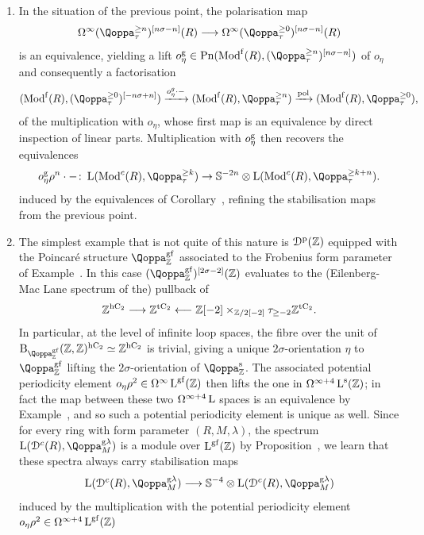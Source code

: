 \begin{examples}
\begin{enumerate}
\item In the situation of the previous point, the polarisation map
\[
\Omega^\infty(\QF^{\geq n}_\tau)\qshift{n\sigma-n}(R) \longrightarrow \Omega^\infty(\QF^{\geq 0}_\tau)\qshift{n\sigma-n}(R)
\]
is an equivalence, yielding a lift $o^\mathrm g_\eta \in \Poinc(\Modf{R},(\QF^{\geq n}_\tau)\qshift{n\sigma-n})$ of $o_\eta$ and consequently a factorisation
\[
(\Modf{R},(\QF^{\geq 0}_\tau)\qshift{-n\sigma+n}) \xrightarrow{o_\eta^g \cdot -} (\Modf{R},\QF^{\geq n}_\tau) \xrightarrow{\mathrm{pol}} (\Modf{R},\QF^{\geq 0}_\tau),
\]
of the multiplication with $o_\eta$, whose first map is an equivalence by direct inspection of linear parts. Multiplication with $o_\eta^{\mathrm{g}}$ then recovers the equivalences 
\[
o^\mathrm g_{\eta}\rho^n \cdot - \colon \L(\Mod^c(R),\QF^{\geq k}_{\tau}) \to \SS^{-2n}\otimes \L(\Mod^c(R),\QF^{\geq k+n}_{\tau}).
\]
induced by the equivalences of Corollary~, refining the stabilisation maps from the previous point.
\item 
The simplest example that is not quite of this nature 
is ${\mathcal D}^{\mathrm{p}}(\mathbb{Z})$ equipped with the Poincar\'e structure $\QF^{\g\fr}_{\ZZ}$ associated to the Frobenius
form parameter of Example~.
In this case $(\QF^{\g\fr}_{\ZZ})\qshift{2\sigma-2}(\ZZ)$ evaluates to the (Eilenberg-Mac Lane spectrum of the) pullback of
\[
\mathbb{Z}^{\mathrm{h}\mathrm{C_2}} \longrightarrow \mathbb{Z}^{\mathrm{t}\mathrm{C_2}} \longleftarrow \mathbb{Z}[-2] \times_{\mathbb{Z}/2[-2]} \tau_{\geq -2}\mathbb{Z}^{\mathrm{t}\mathrm{C_2}}.
\]
In particular, at the level of infinite loop spaces, the fibre over the unit of $\Bil_{\QF^{\g\fr}_{\ZZ}}(\ZZ, \ZZ)^{\hC} \simeq \ZZ^\hC$ is trivial, giving a unique $2\sigma$-orientation $\eta$ to $\QF^{\g\fr}_{\ZZ}$ lifting the $2\sigma$-orientation of $\QF^{\sym}_{\ZZ}$. The associated potential periodicity element $o_{\eta}\rho^2  \in \Omega^{\infty}\operatorname L^{\mathrm{g}\mathrm{f}}(\mathbb{Z})$ then lifts the one in $\Omega^{\infty+4}\operatorname L^{\mathrm{s}}(\mathbb{Z})$; in fact the map between these two $\Omega^{\infty+4}\operatorname L$ spaces is an equivalence by Example~, and so such a potential periodicity element is unique as well.
Since for every ring with form parameter $(R,M,\lambda)$, the spectrum $\L(\D^c(R),\QF^{\mathrm g\lambda}_M)$ is a module over $\operatorname L^{\mathrm{g}\mathrm{f}}(\mathbb{Z})$
by Proposition~, we learn that these spectra always carry stabilisation maps
\[
\L(\D^c(R),\QF^{\mathrm g\lambda}_M) \longrightarrow \SS^{-4}\otimes \L(\D^c(R),\QF^{\mathrm g\lambda}_M)
\]
induced by the multiplication with the potential periodicity element $o_{\eta}\rho^2 \in \Omega^{\infty+4}\operatorname L^{\mathrm{g}\mathrm{f}}(\mathbb{Z})$ 

\end{enumerate}
\end{examples}
